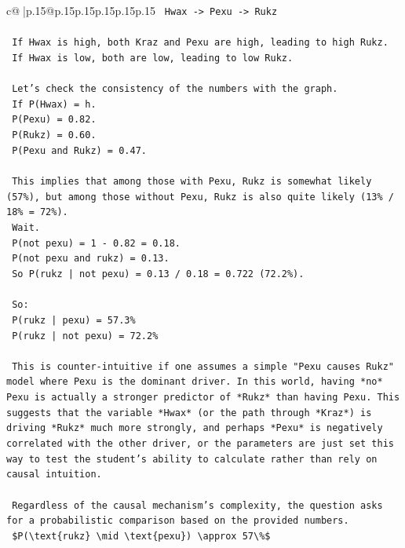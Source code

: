 \documentclass{article}
\begin{document}
{\begin{supertabular}{c@{$\;$}|p{.15\linewidth}@{}p{.15\linewidth}p{.15\linewidth}p{.15\linewidth}p{.15\linewidth}p{.15\linewidth}}
{{{\texttt{    Hwax {-}> Pexu {-}> Rukz} \\
\\ 
\texttt{    If Hwax is high, both Kraz and Pexu are high, leading to high Rukz.} \\
\texttt{    If Hwax is low, both are low, leading to low Rukz.} \\
\\ 
\texttt{    Let's check the consistency of the numbers with the graph.} \\
\texttt{    If P(Hwax) = h.} \\
\texttt{    P(Pexu) = 0.82.} \\
\texttt{    P(Rukz) = 0.60.} \\
\texttt{    P(Pexu and Rukz) = 0.47.} \\
\\ 
\texttt{    This implies that among those with Pexu, Rukz is somewhat likely (57\%), but among those without Pexu, Rukz is also quite likely (13\% / 18\% = 72\%).} \\
\texttt{    Wait.} \\
\texttt{    P(not pexu) = 1 {-} 0.82 = 0.18.} \\
\texttt{    P(not pexu and rukz) = 0.13.} \\
\texttt{    So P(rukz | not pexu) = 0.13 / 0.18 = 0.722 (72.2\%).} \\
\\ 
\texttt{    So:} \\
\texttt{    P(rukz | pexu) = 57.3\%} \\
\texttt{    P(rukz | not pexu) = 72.2\%} \\
\\ 
\texttt{    This is counter{-}intuitive if one assumes a simple "Pexu causes Rukz" model where Pexu is the dominant driver. In this world, having *no* Pexu is actually a stronger predictor of *Rukz* than having Pexu. This suggests that the variable *Hwax* (or the path through *Kraz*) is driving *Rukz* much more strongly, and perhaps *Pexu* is negatively correlated with the other driver, or the parameters are just set this way to test the student's ability to calculate rather than rely on causal intuition.} \\
\\ 
\texttt{    Regardless of the causal mechanism's complexity, the question asks for a probabilistic comparison based on the provided numbers.} \\
\texttt{    \$P(\textbackslash{}text\{rukz\} \textbackslash{}mid \textbackslash{}text\{pexu\}) \textbackslash{}approx 57\textbackslash{}\%\$} \\
}}}
\end{supertabular}}
\end{document}
